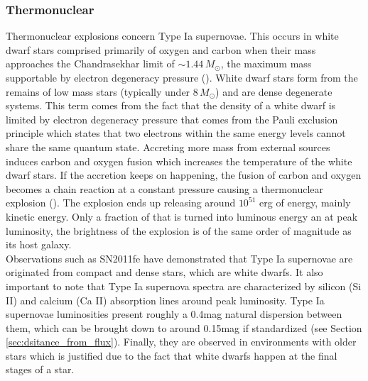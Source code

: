 \subsubsection{Thermonuclear}

Thermonuclear explosions concern Type Ia supernovae. This occurs in white dwarf stars comprised primarily of oxygen and carbon when their mass approaches 
the Chandrasekhar limit of $\sim 1.44 \, M_{\odot}$, the maximum mass supportable by 
electron degeneracy pressure (\cite{Chandrasekhar_1931}). White dwarf stars form from the remains of low mass stars (typically under $8 \, M_{\odot}$) and are dense degenerate systems. 
This term comes from the fact that the density of a white dwarf is limited by electron degeneracy pressure that comes from the Pauli exclusion principle which states that 
two electrons within the same energy levels cannot share the same quantum state. Accreting more mass from external sources induces carbon and oxygen fusion which increases 
the temperature of the white dwarf stars. If the accretion keeps on happening, the fusion of carbon and oxygen becomes a chain reaction at a constant pressure causing a 
thermonuclear explosion (\cite{Ropke_2004}). The explosion ends up releasing around $10^{51}$ erg of energy, mainly kinetic energy. Only a fraction of that is turned into luminous energy 
an at peak luminosity, the brightness of the explosion is of the same order of magnitude as its host galaxy. \\

Observations such as SN2011fe have demonstrated that Type Ia supernovae are originated from compact and dense stars, which are white dwarfs. It also important to note that 
Type Ia supernova spectra are characterized by silicon (Si II) and calcium (Ca II) absorption lines around peak luminosity. 
Type Ia supernovae luminosities present roughly a 0.4mag natural dispersion between them, which can be brought down to around 0.15mag if standardized (see Section \ref{sec:dsitance_from_flux}). 
Finally, they are observed in environments with older stars 
which is justified due to the fact that white dwarfs happen at the final stages of a star. \\

